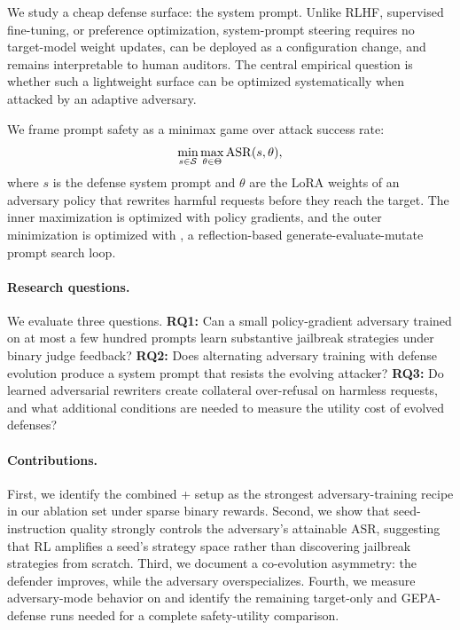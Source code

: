 We study a cheap defense surface: the system prompt. 
Unlike RLHF, supervised fine-tuning, or preference optimization, system-prompt steering requires no target-model weight updates, can be deployed as a configuration change, and remains interpretable to human auditors. 
The central empirical question is whether such a lightweight surface can be optimized systematically when attacked by an adaptive adversary.

We frame prompt safety as a minimax game over attack success rate:
\begin{equation}
    \min_{s \in \mathcal{S}} \max_{\theta \in \Theta} \mathrm{ASR}(s,\theta),
    \label{eq:minimax}
\end{equation}
where $s$ is the defense system prompt and $\theta$ are the LoRA weights of an adversary policy that rewrites harmful requests before they reach the target. 
The inner maximization is optimized with policy gradients, and the outer minimization is optimized with \gepa{}, a reflection-based generate-evaluate-mutate prompt search loop.

\paragraph{Research questions.}
We evaluate three questions. 
\textbf{RQ1:} Can a small policy-gradient adversary trained on at most a few hundred \harmbench{} prompts learn substantive jailbreak strategies under binary judge feedback? 
\textbf{RQ2:} Does alternating adversary training with defense evolution produce a system prompt that resists the evolving attacker? 
\textbf{RQ3:} Do learned adversarial rewriters create collateral over-refusal on harmless requests, and what additional \xstest{} conditions are needed to measure the utility cost of evolved defenses?

\paragraph{Contributions.}
First, we identify the combined \rloo{}+\lp{} setup as the strongest adversary-training recipe in our ablation set under sparse binary rewards. 
Second, we show that seed-instruction quality strongly controls the adversary's attainable ASR, suggesting that RL amplifies a seed's strategy space rather than discovering jailbreak strategies from scratch. 
Third, we document a co-evolution asymmetry: the defender improves, while the adversary overspecializes. 
Fourth, we measure adversary-mode behavior on \xstest{} and identify the remaining target-only and GEPA-defense \xstest{} runs needed for a complete safety-utility comparison.

